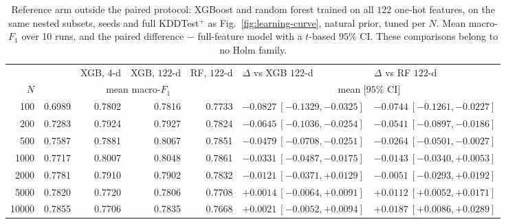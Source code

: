 \begin{table}[t]
\centering
\caption{Reference arm outside the paired protocol: XGBoost and random forest trained on all
$122$ one-hot features, on the same nested subsets, seeds and full KDDTest$^+$ as
Fig.~\ref{fig:learning-curve}, natural prior, tuned per $N$. Mean macro-$F_1$ over
10 runs, and the paired difference \QSVM{} $-$ full-feature model with a $t$-based
$95\%$ CI. These comparisons belong to no Holm family.}
\label{tab:ref-arm}
\footnotesize
\setlength{\tabcolsep}{3pt}
\begin{tabular}{@{}r rr rr l l@{}}
\toprule
 & \QSVM{} & XGB, $4$-d & XGB, $122$-d & RF, $122$-d & $\Delta$ vs XGB $122$-d & $\Delta$ vs RF $122$-d \\
$N$ & \multicolumn{4}{c}{mean macro-$F_1$} & \multicolumn{2}{c}{mean $[95\%$ CI$]$} \\
\midrule
100 & 0.6989 & 0.7802 & 0.7816 & 0.7733 & $-0.0827\ [-0.1329,-0.0325]$ & $-0.0744\ [-0.1261,-0.0227]$ \\
200 & 0.7283 & 0.7924 & 0.7927 & 0.7824 & $-0.0645\ [-0.1036,-0.0254]$ & $-0.0541\ [-0.0897,-0.0186]$ \\
500 & 0.7587 & 0.7881 & 0.8067 & 0.7851 & $-0.0479\ [-0.0708,-0.0251]$ & $-0.0264\ [-0.0501,-0.0027]$ \\
1000 & 0.7717 & 0.8007 & 0.8048 & 0.7861 & $-0.0331\ [-0.0487,-0.0175]$ & $-0.0143\ [-0.0340,+0.0053]$ \\
2000 & 0.7781 & 0.7910 & 0.7902 & 0.7832 & $-0.0121\ [-0.0371,+0.0129]$ & $-0.0051\ [-0.0293,+0.0192]$ \\
5000 & 0.7820 & 0.7720 & 0.7806 & 0.7708 & $+0.0014\ [-0.0064,+0.0091]$ & $+0.0112\ [+0.0052,+0.0171]$ \\
10000 & 0.7855 & 0.7706 & 0.7835 & 0.7668 & $+0.0021\ [-0.0052,+0.0094]$ & $+0.0187\ [+0.0086,+0.0289]$ \\
\bottomrule
\end{tabular}
\end{table}

